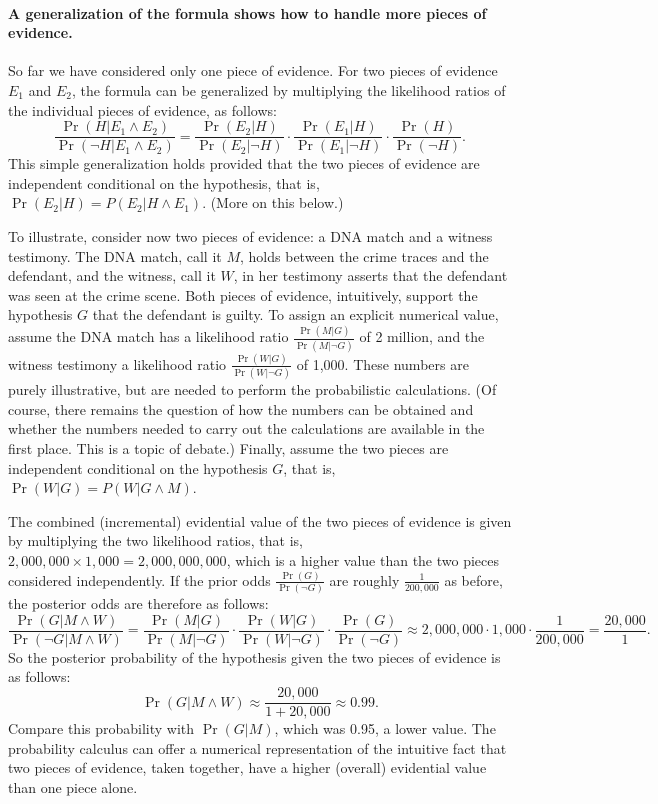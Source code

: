\documentclass[10pt]{article}
\begin{document}
\paragraph{A generalization of the formula shows how to handle more pieces of evidence.} 
So far we have considered only one piece of evidence. 
For two pieces of evidence $E_1$ and $E_2$, the formula can be generalized 
by multiplying the likelihood ratios of the individual pieces of evidence, as follows:
	\[ \frac{\Pr(H|E_1 \land E_2)}{\Pr(\neg H | E_1 \land E_2)} = 
	\frac{\Pr(E_2 | H)}{\Pr(E_2| \neg H)}
	\cdot 
	\frac{\Pr(E_1 | H)}{\Pr(E_1| \neg H)}
	\cdot 
	\frac{\Pr(H)}{\Pr(\neg H)}.\]
This simple generalization holds provided that the two pieces of evidence are 
independent conditional on the hypothesis, that is, $\Pr(E_2| H)=P(E_2| H \wedge E_1)$. 
(More on this below.) 

To illustrate, consider now two pieces of evidence: a DNA match and a witness testimony.
The DNA match, call it $M$, holds between the crime traces and the defendant, and 
the witness, call it $W$, in her testimony asserts that the defendant was 
seen at the crime scene. 
Both pieces of evidence, intuitively, support the hypothesis $G$ that the defendant 
is guilty. To assign an explicit numerical value, assume
 the DNA match has a likelihood ratio $\frac{\Pr(M | G)}{\Pr( M | \neg G)}$ of 2 million, 
and the witness testimony a likelihood ratio $\frac{\Pr(W | G)}{\Pr( W | \neg G)}$ of 1,000. 
These numbers are purely illustrative, but are needed to perform the probabilistic calculations. (Of course, there remains the 
question of how the numbers can be obtained and whether the numbers 
needed to carry out the calculations are available in the first place. This is a topic of debate.) Finally, assume the two pieces are independent conditional on the hypothesis $G$, that is, 
$\Pr(W|G)=P(W| G\wedge M)$. 

The combined (incremental) evidential value of the two pieces of evidence is given by multiplying the two likelihood 
ratios, that is, $2,000,000\times 1,000=2,000,000,000$, which is a higher value 
than the two pieces considered independently. 
If the prior odds $\frac{\Pr(G)}{\Pr(\neg G)}$ are roughly $\frac{1}{200,000}$
as before, the posterior odds are therefore as follows:
%
\[\frac{\Pr(G|M\wedge W)}{\Pr(\neg G|M\wedge W)}= \frac{\Pr(M |G)}{\Pr( M | \neg G)}\cdot \frac{\Pr(W |G)}{\Pr( W | \neg G)}\cdot \frac{\Pr(G)}{\Pr(\neg G)} \approx 2,000,000 \cdot 1,000 \cdot \frac{1}{200,000}= \frac{20,000}{1}.\]
% 
So the posterior probability of the hypothesis given the two pieces of evidence is as follows:
%
\[\Pr(G|M\wedge W) \approx \frac{20,000}{1+20,000}\approx 0.99.\]
%
Compare this probability with $\Pr(G|M)$, which 
was 0.95, a lower value. The probability calculus can offer a numerical 
representation of the intuitive fact that two pieces of evidence, taken together, 
have a higher (overall) evidential value than one piece alone. 
\end{document}
